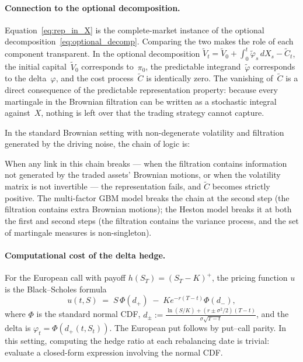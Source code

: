 \paragraph{Connection to the optional decomposition.}
Equation~\eqref{eq:rep_in_X} is the complete-market instance of the
optional decomposition~\eqref{eq:optional_decomp}.  Comparing the two
makes the role of each component transparent.  In the optional
decomposition $\tilde{V}_t = \tilde{V}_0 + \int_0^t \tilde{\varphi}_s
\, dX_s - \tilde{C}_t$, the initial capital~$\tilde{V}_0$ corresponds
to~$\pi_0$, the predictable integrand~$\tilde{\varphi}$ corresponds to
the delta~$\varphi$, and the cost process~$\tilde{C}$ is identically
zero.  The vanishing of~$\tilde{C}$ is a direct consequence of the
predictable representation property: because every martingale in the
Brownian filtration can be written as a stochastic integral against~$X$,
nothing is left over that the trading strategy cannot capture.

In the standard Brownian setting with non-degenerate volatility and
filtration generated by the driving noise, the chain of logic is:
\begin{center}
\end{center}
When any link in this chain breaks --- when the filtration contains
information not generated by the traded assets' Brownian motions, or when
the volatility matrix is not invertible --- the representation fails, and
$\tilde{C}$ becomes strictly positive.  The multi-factor GBM model breaks
the chain at the second step (the filtration contains extra Brownian
motions); the Heston model breaks it at both the first and second steps
(the filtration contains the variance process, and the set of martingale
measures is non-singleton).

\paragraph{Computational cost of the delta hedge.}
For the European call with payoff $h(S_T) = (S_T - K)^+$, the pricing
function $u$ is the Black--Scholes formula
\begin{equation}
\label{eq:BS_call}
u(t, S) \;=\; S \, \Phi(d_+) \;-\; K e^{-r(T-t)} \Phi(d_-),
\end{equation}
where $\Phi$ is the standard normal CDF,
$d_{\pm} := \frac{\ln(S/K) + (r \pm \sigma^2/2)(T-t)}{\sigma\sqrt{T-t}}$,
and the delta is $\varphi_t = \Phi(d_+(t, S_t))$.  The European put
follows by put--call parity.  In this setting, computing the hedge ratio
at each rebalancing date is trivial: evaluate a closed-form expression
involving the normal CDF.

